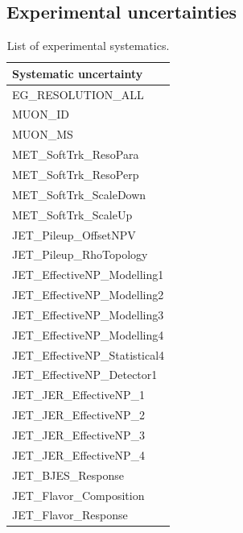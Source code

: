\documentclass[letterpaper,12pt]{article}
\begin{document}
\newpage
	

\subsection{Experimental uncertainties}








\begin{table}[H]
\begin{centering}
\begin{tabular}{p{25em}}

          \hline
          \textbf{Systematic uncertainty}
          \\
          \hline
          \hline
        EG\_RESOLUTION\_ALL
        \\
		\hline
		MUON\_ID
		\\
		MUON\_MS
		\\
		\hline
		MET\_SoftTrk\_ResoPara
		\\
		MET\_SoftTrk\_ResoPerp
		\\
		MET\_SoftTrk\_ScaleDown
		\\
		MET\_SoftTrk\_ScaleUp
		\\
		\hline
		JET\_Pileup\_OffsetNPV
		\\
		JET\_Pileup\_RhoTopology
		\\
		\hline
		JET\_EffectiveNP\_Modelling1
		\\ 
		JET\_EffectiveNP\_Modelling2
		\\ 
		JET\_EffectiveNP\_Modelling3
		\\ 
		JET\_EffectiveNP\_Modelling4
		\\ 
		JET\_EffectiveNP\_Statistical4
		\\ 
		JET\_EffectiveNP\_Detector1
		\\ 
		\hline 
		JET\_JER\_EffectiveNP\_1
		\\ 
		JET\_JER\_EffectiveNP\_2
		\\ 
		JET\_JER\_EffectiveNP\_3
		\\ 
		JET\_JER\_EffectiveNP\_4
		\\ 
		\hline 
		JET\_BJES\_Response
		\\ 
		\hline 
		JET\_Flavor\_Composition
		\\ 
		JET\_Flavor\_Response
        \\ 
        \hline

 \end{tabular} 
 
 \end{centering}
 \caption{List of experimental systematics.}\label{tab:systematics}
 \end{table}
\end{document}
